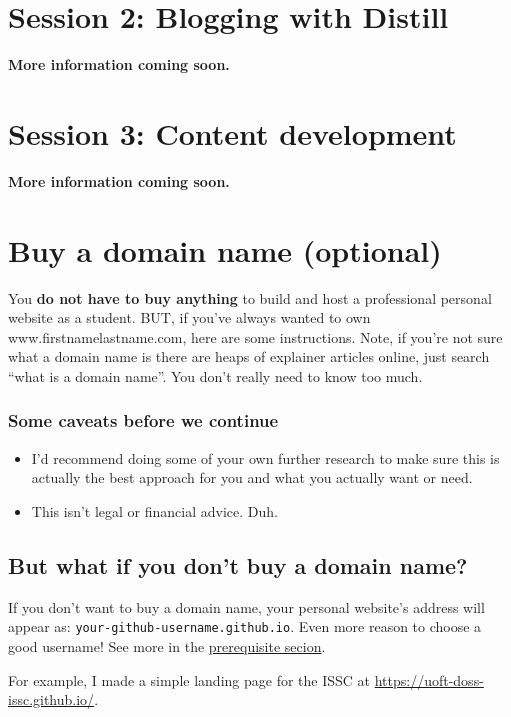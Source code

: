 \documentclass[
]{article}
\providecommand{\tightlist}{%
  \setlength{\itemsep}{0pt}\setlength{\parskip}{0pt}}
\begin{document}
\hypertarget{session-2-blogging-with-distill}{%
\section{Session 2: Blogging with Distill}\label{session-2-blogging-with-distill}}

\textbf{More information coming soon.}

\hypertarget{session-3-content-development}{%
\section{Session 3: Content development}\label{session-3-content-development}}

\textbf{More information coming soon.}

\hypertarget{appendix-appendix}{%
\appendix}


\hypertarget{domain}{%
\section{Buy a domain name (optional)}\label{domain}}

You \textbf{do not have to buy anything} to build and host a professional personal website as a student. BUT, if you've always wanted to own www.firstnamelastname.com, here are some instructions. Note, if you're not sure what a domain name is there are heaps of explainer articles online, just search ``what is a domain name''. You don't really need to know too much.

\hypertarget{some-caveats-before-we-continue}{%
\subsubsection{Some caveats before we continue}\label{some-caveats-before-we-continue}}

\begin{itemize}
\tightlist
\item
  I'd recommend doing some of your own further research to make sure this is actually the best approach for you and what you actually want or need.
\item
  This isn't legal or financial advice. Duh.
\end{itemize}

\hypertarget{but-what-if-you-dont-buy-a-domain-name}{%
\subsection{But what if you don't buy a domain name?}\label{but-what-if-you-dont-buy-a-domain-name}}

If you don't want to buy a domain name, your personal website's address will appear as: \texttt{your-github-username.github.io}. Even more reason to choose a good username! See more in the \protect\hyperlink{prereqs}{prerequisite secion}.

For example, I made a simple landing page for the ISSC at \url{https://uoft-doss-issc.github.io/}.
\end{document}
